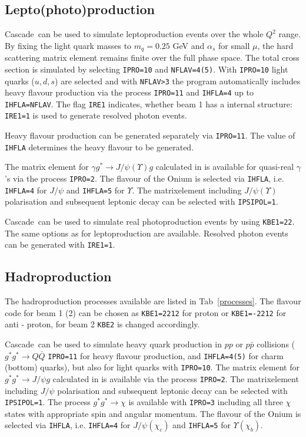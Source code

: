 \documentclass[11pt]{article} \usepackage{mystyle-new}
\def\CASCADE{{\sc Cascade}}
\begin{document}
\subsection{Lepto(photo)production}  

\CASCADE\ can be used to simulate leptoproduction events over the whole $Q^2$
range. By fixing the light quark masses to  $m_q=0.25$ GeV
and $\alpha_s$ for small $\mu$, the hard scattering
matrix element remains finite over the full phase space.
The total cross section is simulated by selecting \verb+IPRO=10+ and 
\verb+NFLAV=4(5)+. With \verb+IPRO=10+ light quarks ($u,d,s$) are selected  and
with \verb+NFLAV>3+ the program automatically includes heavy flavour production
via the process \verb+IPRO=11+ and \verb+IHFLA=4+ up to \verb+IHFLA=NFLAV+.
The flag \verb+IRE1+ indicates, whether beam 1 has a internal structure: 
\verb+IRE1=1+ is used to generate resolved photon events. 
\par
Heavy flavour production can be generated separately via \verb+IPRO=11+. 
The value of \verb+IHFLA+ determines the heavy flavour to be generated.
\par
The matrix element for $\gamma g^* \to J/\psi (\Upsilon) g$ calculated in
\cite{Lipatov:2002tc,Baranov:2003at,Baranov:2002cf} is available for quasi-real $\gamma$'s via the process
\verb+IPRO=2+. The flavour of the Onium is selected via \verb+IHFLA+, i.e. \verb+IHFLA=4+ for $J/\psi$ and \verb+IHFLA=5+ for $\Upsilon$.
The matrixelement including $J/\psi (\Upsilon)$ polarisation and subsequent leptonic decay can be selected with \verb+IPSIPOL=1+.

\CASCADE\ can be used to simulate 
real photoproduction events by using \verb+KBE1=22+. The same options as for
leptoproduction are available. Resolved photon events can be generated with
\verb+IRE1=1+. 


\subsection{Hadroproduction}
The hadroproduction processes available are listed in Tab~\ref{processes}.
The flavour code for beam 1 (2) can be
 chosen as \verb+KBE1=2212+ for proton or \verb+KBE1=-2212+ for anti - proton,
 for beam 2 \verb+KBE2+ is changed accordingly. 

\CASCADE\ can be used to simulate heavy quark production in
 $p p$ or $p \bar{p}$ collisions ($g^*g^* \to Q \bar{Q}$ 
 \verb+IPRO=11+ for heavy flavour production,
 and \verb+IHFLA=4(5)+ for charm (bottom) quarks), but also for light quarks with
 \verb+IPRO=10+. The matrix element for $g^* g^* \to J/\psi g$  calculated in
\cite{Lipatov:2002tc,Baranov:2003at,Baranov:2002cf} is available via the process
\verb+IPRO=2+. 
The matrixelement including $J/\psi$ polarisation and subsequent leptonic decay can be selected with \verb+IPSIPOL=1+. The process $g^*g^* \to \chi$ is available with \verb+IPRO=3+ including all three $\chi$ states with appropriate spin and angular momentum. The flavour of the Onium is selected via \verb+IHFLA+, i.e. \verb+IHFLA=4+ for $J/\psi (\chi_c)$ and \verb+IHFLA=5+ for $\Upsilon (\chi_b)$.
\end{document}

